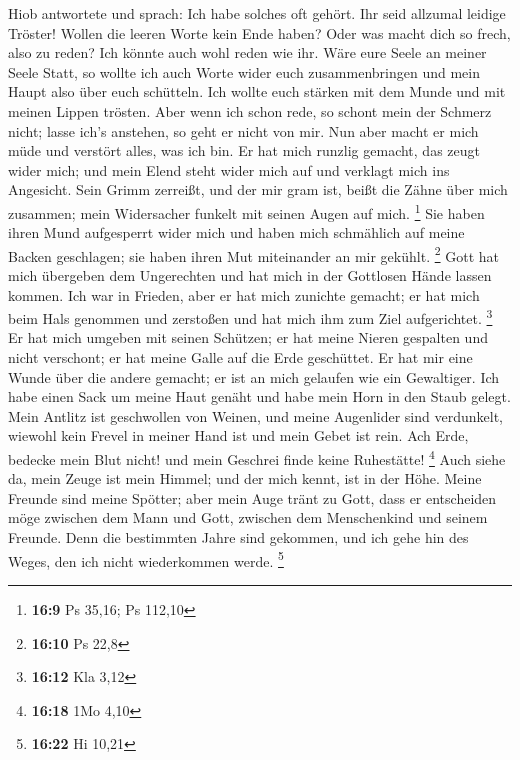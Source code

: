  Hiob antwortete und sprach:  Ich habe solches
oft gehört. Ihr seid allzumal leidige Tröster!  Wollen die
leeren Worte kein Ende haben? Oder was macht dich so frech, also zu
reden?  Ich könnte auch wohl reden wie ihr. Wäre eure Seele
an meiner Seele Statt, so wollte ich auch Worte wider euch
zusammenbringen und mein Haupt also über euch schütteln. 
Ich wollte euch stärken mit dem Munde und mit meinen Lippen trösten.
 Aber wenn ich schon rede, so schont mein der Schmerz nicht;
lasse ich's anstehen, so geht er nicht von mir.  Nun aber
macht er mich müde und verstört alles, was ich bin.  Er hat
mich runzlig gemacht, das zeugt wider mich; und mein Elend steht wider
mich auf und verklagt mich ins Angesicht.  Sein Grimm
zerreißt, und der mir gram ist, beißt die Zähne über mich zusammen; mein
Widersacher funkelt mit seinen Augen auf mich. \footnote{\textbf{16:9}
  Ps 35,16; Ps 112,10}  Sie haben ihren Mund aufgesperrt
wider mich und haben mich schmählich auf meine Backen geschlagen; sie
haben ihren Mut miteinander an mir gekühlt. \footnote{\textbf{16:10} Ps
  22,8}  Gott hat mich übergeben dem Ungerechten und hat
mich in der Gottlosen Hände lassen kommen.  Ich war in
Frieden, aber er hat mich zunichte gemacht; er hat mich beim Hals
genommen und zerstoßen und hat mich ihm zum Ziel aufgerichtet.
\footnote{\textbf{16:12} Kla 3,12}  Er hat mich umgeben mit
seinen Schützen; er hat meine Nieren gespalten und nicht verschont; er
hat meine Galle auf die Erde geschüttet.  Er hat mir eine
Wunde über die andere gemacht; er ist an mich gelaufen wie ein
Gewaltiger.  Ich habe einen Sack um meine Haut genäht und
habe mein Horn in den Staub gelegt.  Mein Antlitz ist
geschwollen von Weinen, und meine Augenlider sind verdunkelt,
 wiewohl kein Frevel in meiner Hand ist und mein Gebet ist
rein.  Ach Erde, bedecke mein Blut nicht! und mein Geschrei
finde keine Ruhestätte! \footnote{\textbf{16:18} 1Mo 4,10} 
Auch siehe da, mein Zeuge ist mein Himmel; und der mich kennt, ist in
der Höhe.  Meine Freunde sind meine Spötter; aber mein Auge
tränt zu Gott,  dass er entscheiden möge zwischen dem Mann
und Gott, zwischen dem Menschenkind und seinem Freunde. 
Denn die bestimmten Jahre sind gekommen, und ich gehe hin des Weges, den
ich nicht wiederkommen werde. \footnote{\textbf{16:22} Hi 10,21}

